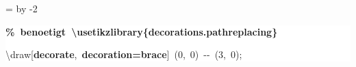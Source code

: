 \begingroup
\ttfamily
{}
=\textwidth
\advance{} by -2\fboxsep
\noindent
\colorbox{background}
{%
\parbox{\dimen255}
{%
\rule[-0.5ex]{0pt}{2.5ex}\hspace*{0.0em}\textcolor{G}{\textbf{\%~benoetigt~\textbackslash{}usetikzlibrary\{decorations.pathreplacing\}}}\\
\rule[-0.5ex]{0pt}{2.5ex}\hspace*{0.0em}\textbackslash{}draw[\textcolor{R}{\textbf{decorate}},~\textcolor{R}{\textbf{decoration=brace}}]~(0,~0)~{-}{-}~(3,~0);}%
}%
\endgroup
